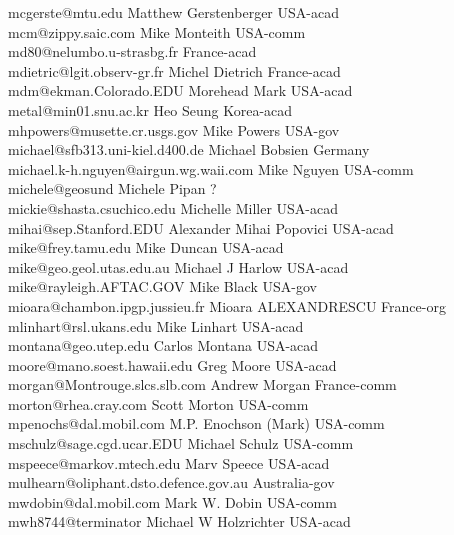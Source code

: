 \begin{tabbing}
mcgerste@mtu.edu \> Matthew Gerstenberger \> USA-acad\\
mcm@zippy.saic.com \> Mike Monteith \> USA-comm\\
md80@nelumbo.u-strasbg.fr \> \> France-acad\\
mdietric@lgit.observ-gr.fr \> Michel Dietrich \> France-acad\\
mdm@ekman.Colorado.EDU \>  Morehead Mark \> USA-acad\\
metal@min01.snu.ac.kr \> Heo Seung \> Korea-acad\\
mhpowers@musette.cr.usgs.gov \> Mike Powers \> USA-gov\\
michael@sfb313.uni-kiel.d400.de \> Michael Bobsien \> Germany\\
michael.k-h.nguyen@airgun.wg.waii.com \> Mike Nguyen \> USA-comm\\
michele@geosund \> Michele Pipan \> ?\\
mickie@shasta.csuchico.edu \> Michelle Miller \> USA-acad\\
mihai@sep.Stanford.EDU \> Alexander Mihai Popovici \> USA-acad\\
mike@frey.tamu.edu \> Mike Duncan \> USA-acad\\
mike@geo.geol.utas.edu.au \> Michael J Harlow \> USA-acad\\
mike@rayleigh.AFTAC.GOV \> Mike Black \> USA-gov\\
mioara@chambon.ipgp.jussieu.fr \> Mioara ALEXANDRESCU \> France-org\\
mlinhart@rsl.ukans.edu \> Mike Linhart \> USA-acad\\
montana@geo.utep.edu \> Carlos Montana \> USA-acad\\
moore@mano.soest.hawaii.edu \> Greg Moore \> USA-acad\\
morgan@Montrouge.slcs.slb.com \> Andrew Morgan \> France-comm\\
morton@rhea.cray.com \> Scott Morton \> USA-comm\\
mpenochs@dal.mobil.com \> M.P. Enochson (Mark) \> USA-comm\\
mschulz@sage.cgd.ucar.EDU \> Michael Schulz \> USA-comm\\
mspeece@markov.mtech.edu \> Marv Speece \> USA-acad\\
mulhearn@oliphant.dsto.defence.gov.au \> \> Australia-gov\\
mwdobin@dal.mobil.com \> Mark W. Dobin \> USA-comm\\
mwh8744@terminator \> Michael W Holzrichter \> USA-acad\\

\end{tabbing}
